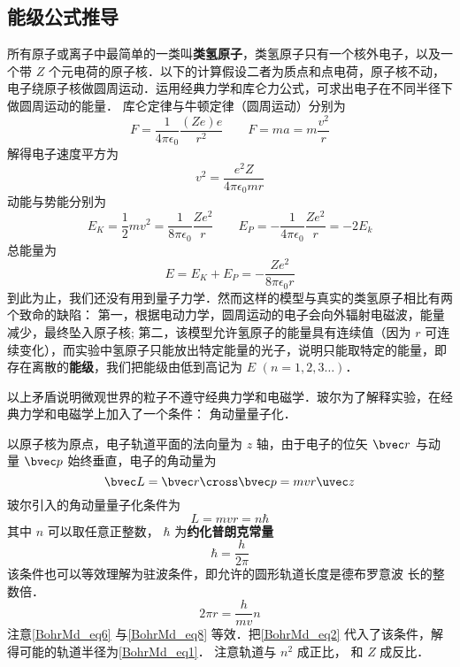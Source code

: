 \subsection{能级公式推导}
所有原子或离子中最简单的一类叫\textbf{类氢原子}，类氢原子只有一个核外电子，以及一个带 $Z$ 个元电荷的原子核．以下的计算假设二者为质点和点电荷，原子核不动，电子绕原子核做圆周运动．运用经典力学和库仑力公式，可求出电子在不同半径下做圆周运动的能量． 库仑定律与牛顿定律（圆周运动）分别为
\begin{equation}
F = \frac{1}{4\pi \epsilon_0} \frac{(Ze)e}{r^2}
\qquad
F = ma = m\frac{v^2}{r}
\end{equation}
解得电子速度平方为
\begin{equation}\label{BohrMd_eq2}
v^2 = \frac{e^2 Z}{4\pi \epsilon_0 mr}
\end{equation}
动能与势能分别为
\begin{equation}
E_K = \frac12 m v^2 = \frac{1}{8\pi\epsilon_0} \frac{Z e^2}{r}
\qquad
E_P =  -\frac{1}{4\pi\epsilon_0} \frac{Ze^2}{r} = -2 E_k
\end{equation}   
总能量为
\begin{equation}\label{BohrMd_eq4}
E = E_K + E_P =  -\frac{Z e^2}{8\pi\epsilon_0 r}
\end{equation}
到此为止，我们还没有用到量子力学．然而这样的模型与真实的类氢原子相比有两个致命的缺陷： 第一，根据电动力学，圆周运动的电子会向外辐射电磁波，能量减少，最终坠入原子核; 第二，该模型允许氢原子的能量具有连续值（因为 $r$ 可连续变化），而实验中氢原子只能放出特定能量的光子，说明只能取特定的能量，即存在离散的\textbf{能级}，我们把能级由低到高记为 $E$  $(n = 1,2,3\dots)$． 

以上矛盾说明微观世界的粒子不遵守经典力学和电磁学．玻尔为了解释实验，在经典力学和电磁学上加入了一个条件： 角动量量子化．

以原子核为原点，电子轨道平面的法向量为 $z$ 轴，由于电子的位矢 $\bvec r$ 与动量 $\bvec p$ 始终垂直，电子的角动量为
\begin{equation}
\bvec L = \bvec r \cross \bvec p = mvr \uvec z
\end{equation}
玻尔引入的角动量量子化条件为
\begin{equation}\label{BohrMd_eq6}
L = mvr = n\hbar
\end{equation}
其中 $n$ 可以取任意正整数， $\hbar$ 为\textbf{约化普朗克常量}
\begin{equation}\label{BohrMd_eq7}
\hbar  = \frac{h}{2\pi}
\end{equation}
该条件也可以等效理解为驻波条件，即允许的圆形轨道长度是德布罗意波%
长的整数倍．
\begin{equation}\label{BohrMd_eq8}
2\pi r  = \frac{h}{mv} n
\end{equation}
注意\autoref{BohrMd_eq6} 与\autoref{BohrMd_eq8} 等效．把\autoref{BohrMd_eq2} 代入了该条件，解得可能的轨道半径为\autoref{BohrMd_eq1}． 注意轨道与 $n^2$ 成正比， 和 $Z$ 成反比．


